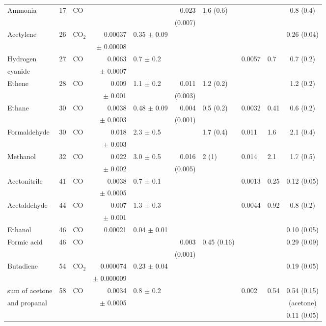 \documentclass[acp, manuscript]{copernicus}
\begin{document}
\begin{supertabular}{l l l r l r l l l c}
    Ammonia & 17 &  CO & & & 0.023  & 1.6 (0.6) & & & 0.8 (0.4) \\
  &  & & & & (0.007)& & & & \\
  Acetylene & 26  & CO$_2$ & 0.00037  & 0.35 $\pm$ 0.09 & & & & & 0.26 (0.04) \\ 
  &&&$\pm$ 0.00008&&&&&&\\
  Hydrogen  & 27 & CO & 0.0063  & 0.7 $\pm$ 0.2 & & & 0.0057 & 0.7 & 0.7 (0.2) \\ 
  cyanide&&&$\pm$ 0.0007&&&&&&\\
  Ethene & 28 &  CO & 0.009 & 1.1 $\pm$ 0.2& 0.011  & 1.2 (0.2) & & & 1.2 (0.2) \\ 
  &&&$\pm$ 0.001&&(0.003)&&&&\\
  Ethane & 30  & CO & 0.0038 & 0.48 $\pm$ 0.09 & 0.004  & 0.5 (0.2) & 0.0032& 0.41 & 0.6 (0.2) \\
  &&&$\pm$ 0.0003&&(0.001)&&&&\\
  Formaldehyde & 30  & CO & 0.018 & 2.3 $\pm$ 0.5 &  & 1.7 (0.4) & 0.011 & 1.6 & 2.1 (0.4) \\
  &&&$\pm$ 0.003&&&&&&\\
  Methanol & 32  & CO & 0.022 & 3.0 $\pm$ 0.5 & 0.016  & 2 (1) & 0.014 & 2.1 & 1.7 (0.5) \\ 
  &&&$\pm$ 0.002&&(0.005)&&&&\\
  Acetonitrile & 41  & CO & 0.0038 & 0.7 $\pm$ 0.1 & & & 0.0013 & 0.25 & 0.12 (0.05) \\ 
  &&&$\pm$ 0.0005&&&&&&\\
  Acetaldehyde & 44  & CO & 0.007 & 1.3 $\pm$ 0.3& & &0.0044 &0.92 & 0.8 (0.2) \\
  &&&$\pm$ 0.001&&&&&&\\
  Ethanol & 46 & CO & 0.00021& 0.04 $\pm$ 0.01 & & & & & 0.10 (0.05) \\
  Formic acid & 46  &CO & && 0.003 & 0.45 (0.16) & & & 0.29 (0.09) \\ 
  &&&&&(0.001)&&&&\\
  Butadiene &54 & CO$_2$ & 0.000074 & 0.23 $\pm$ 0.04& & & & & 0.19 (0.05) \\ 
  &&&$\pm$ 0.000009&&&&&&\\
  sum of acetone  & 58 & CO & 0.0034 & 0.8 $\pm$ 0.2 & & & 0.002 &0.54 & 0.54 (0.15)  \\
  and propanal &&&$\pm$ 0.0005&&&&&& (acetone) \\
  & &  & & & & & & & 0.11 (0.05) \\

\end{supertabular}
\end{document}
